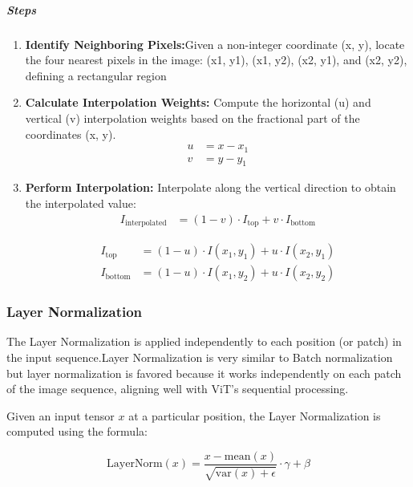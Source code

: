 \noindent \subparagraph{Steps}
\begin{enumerate}
    \item \textbf{Identify Neighboring Pixels:}Given a non-integer coordinate (x, y), locate the four nearest pixels in the image: (x1, y1), (x1, y2), (x2, y1), and (x2, y2), defining a rectangular region

    \item \textbf{Calculate Interpolation Weights:} Compute the horizontal (u) and vertical (v) interpolation weights based on the fractional part of the coordinates (x, y).
          \begin{align}
              u & = x - x_1 \label{eq:u_equation} \\
              v & = y - y_1 \label{eq:v_equation}
          \end{align}


    \item \textbf{Perform Interpolation:} Interpolate along the vertical direction to obtain the interpolated value:
          \begin{align}
              I_{\text{interpolated}} & = (1 - v) \cdot I_{\text{top}} + v \cdot I_{\text{bottom}} \label{eq:interpolated_equation}
          \end{align}


          \begin{align}
              I_{\text{top}}    & = (1 - u) \cdot I(x_1, y_1) + u \cdot I(x_2, y_1) \label{eq:itop_equation}    \\
              I_{\text{bottom}} & = (1 - u) \cdot I(x_1, y_2) + u \cdot I(x_2, y_2) \label{eq:ibottom_equation}
          \end{align}


\end{enumerate}
\subsubsection{Layer Normalization}
The Layer Normalization is applied independently to each position (or patch) in the input sequence.Layer Normalization is very similar to Batch normalization but layer normalization is favored because it works independently on each patch of the image sequence, aligning well with ViT's sequential processing.

\noindent Given an input tensor $x$ at a particular position, the Layer Normalization is computed using the formula:

\begin{equation}
    \text{LayerNorm}(x) = \frac{x - \text{mean}(x)}{\sqrt{\text{var}(x) + \epsilon}} \cdot \gamma + \beta \label{eq:layer_norm}
\end{equation}

